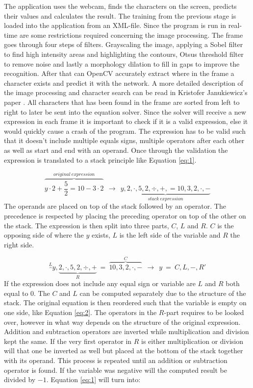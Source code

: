 \documentclass[12pt]{report}
\begin{document}
The application uses the webcam, finds the characters on the screen, predicts their values and calculates the result. The training from the previous stage is loaded into the application from an XML-file. Since the program is run in real-time are some restrictions required concerning the image processing. The frame goes through four steps of filters. Grayscaling the image, applying a Sobel filter to find high intensity areas and highlighting the contours, Otsu\textquotesingle s threshold filter to remove noise and lastly a morphology dilation to fill in gaps to improve the recognition. After that can OpenCV accurately extract where in the frame a character exists and predict it with the network. A more detailed description of the image processing and character search can be read in Kristofer Janukiewicz's paper \cite{kristofer}.
\newline
\newline
All characters that has been found in the frame are sorted from left to right to later be sent into the equation solver. Since the solver will receive a new expression in each frame it is important to check if it is a valid expression, else it would quickly cause a crash of the program. The expression has to be valid such that it doesn't include multiple equals signs, multiple operators after each other as well as start and end with an operand. Once through the validation the expression is translated to a stack principle like Equation \ref{eq:1}.


\begin{equation}
  \label{eq:1}
  \overbrace{ y \cdot 2+\frac{5}{2}=10-3 \cdot 2}^{original \ expression} \ \ \to \ \ \underbrace{y,2,\cdot,5,2,\div,+,=10,3,2,\cdot,-}_{stack \ expression}
\end{equation}
The operands are placed on top of the stack followed by an operator. The precedence is respected by placing the preceding operator on top of the other on the stack. The expression is then split into three parts, $C$, $L$ and $R$. $C$ is the opposing side of where the $y$ exists, $L$ is the left side of the variable and $R$ the right side.

\begin{equation}
  \label{eq:2}
  \overbrace{}^{L}y, \underbrace{2, \cdot ,5,2,\div,+}_{R} \ = \ \overbrace{10,3,2, \cdot ,-}^{C} \ \ \to \ \ y \ = \ C,L,-,R'
\end{equation}
If the expression does not include any equal sign or variable are $L$ and $R$ both equal to $0$. The $C$ and $L$ can be computed separately due to the structure of the stack. The original equation is then reordered such that the variable is empty on one side, like Equation \ref{eq:2}. The operators in the $R$-part requires to be looked over, however in what way depends on the structure of the original expression. Addition and subtraction operators are inverted while multiplication and division kept the same. If the very first operator in $R$ is either multiplication or division will that one be inverted as well but placed at the bottom of the stack together with its operand. This process is repeated until an addition or subtraction operator is found. If the variable was negative will the computed result be divided by $-1$. Equation \ref{eq:1} will turn into:
\end{document}
